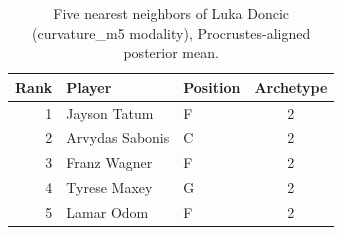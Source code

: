 \begin{table}[htbp]
  \centering\small
  \begin{tabular}{rllc}
    \toprule
    Rank & Player & Position & Archetype \\
    \midrule
    1 & Jayson Tatum & F & 2 \\
    2 & Arvydas Sabonis & C & 2 \\
    3 & Franz Wagner & F & 2 \\
    4 & Tyrese Maxey & G & 2 \\
    5 & Lamar Odom & F & 2 \\
    \bottomrule
  \end{tabular}
  \caption{Five nearest neighbors of Luka Doncic (curvature_m5 modality), Procrustes-aligned posterior mean.}
  \label{tab:Luka_Doncic_neighbors_curvature_m5}
\end{table}


